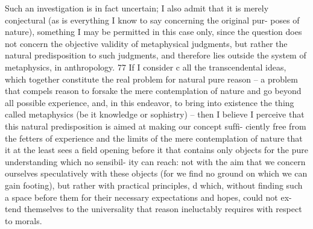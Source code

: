 Such an investigation is in fact uncertain; I also admit that it is merely
conjectural (as is everything I know to say concerning the original pur-
poses of nature), something I may be permitted in this case only, since
the question does not concern the objective validity of metaphysical
judgments, but rather the natural predisposition to such judgments, and
therefore lies outside the system of metaphysics, in anthropology. 77
If I consider c all the transcendental ideas, which together constitute
the real problem for natural pure reason – a problem that compels reason
to forsake the mere contemplation of nature and go beyond all possible
experience, and, in this endeavor, to bring into existence the thing called
metaphysics (be it knowledge or sophistry) – then I believe I perceive
that this natural predisposition is aimed at making our concept sufﬁ-
ciently free from the fetters of experience and the limits of the mere
contemplation of nature that it at the least sees a ﬁeld opening before it
that contains only objects for the pure understanding which no sensibil-
ity can reach: not with the aim that we concern ourselves speculatively
with these objects (for we ﬁnd no ground on which we can gain footing),
but rather with practical principles, d which, without ﬁnding such a space
before them for their necessary expectations and hopes, could not ex-
tend themselves to the universality that reason ineluctably requires with
respect to morals.

